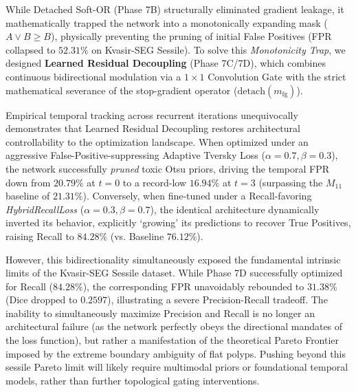 While Detached Soft-OR (Phase 7B) structurally eliminated gradient leakage, it mathematically trapped the network into a monotonically expanding mask ($A \lor B \ge B$), physically preventing the pruning of initial False Positives (FPR collapsed to $52.31\%$ on Kvasir-SEG Sessile). To solve this \textit{Monotonicity Trap}, we designed \textbf{Learned Residual Decoupling} (Phase 7C/7D), which combines continuous bidirectional modulation via a $1\times1$ Convolution Gate with the strict mathematical severance of the stop-gradient operator ($\text{detach}(m_{\text{fg}})$).

Empirical temporal tracking across recurrent iterations unequivocally demonstrates that Learned Residual Decoupling restores architectural controllability to the optimization landscape. When optimized under an aggressive False-Positive-suppressing Adaptive Tversky Loss ($\alpha=0.7, \beta=0.3$), the network successfully \textit{pruned} toxic Otsu priors, driving the temporal FPR down from $20.79\%$ at $t=0$ to a record-low $16.94\%$ at $t=3$ (surpassing the $M_{11}$ baseline of $21.31\%$). Conversely, when fine-tuned under a Recall-favoring \textit{HybridRecallLoss} ($\alpha=0.3, \beta=0.7$), the identical architecture dynamically inverted its behavior, explicitly `growing' its predictions to recover True Positives, raising Recall to $84.28\%$ (vs. Baseline $76.12\%$).

However, this bidirectionality simultaneously exposed the fundamental intrinsic limits of the Kvasir-SEG Sessile dataset. While Phase 7D successfully optimized for Recall ($84.28\%$), the corresponding FPR unavoidably rebounded to $31.38\%$ (Dice dropped to $0.2597$), illustrating a severe Precision-Recall tradeoff. The inability to simultaneously maximize Precision and Recall is no longer an architectural failure (as the network perfectly obeys the directional mandates of the loss function), but rather a manifestation of the theoretical Pareto Frontier imposed by the extreme boundary ambiguity of flat polyps. Pushing beyond this sessile Pareto limit will likely require multimodal priors or foundational temporal models, rather than further topological gating interventions.
